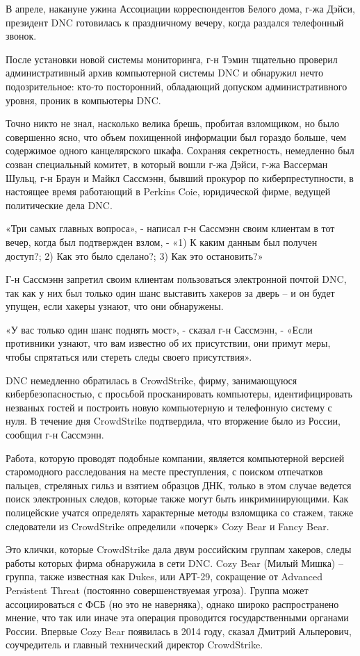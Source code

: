 В апреле, накануне ужина Ассоциации корреспондентов Белого дома, г-жа
Дэйси, президент DNC готовилась к праздничному вечеру, когда раздался
телефонный звонок.

После установки новой системы мониторинга, г-н Тэмин тщательно проверил
административный архив компьютерной системы DNC и обнаружил нечто
подозрительное: кто-то посторонний, обладающий допуском
административного уровня, проник в компьютеры DNC.

Точно никто не знал, насколько велика брешь, пробитая взломщиком, но
было совершенно ясно, что объем похищенной информации был гораздо
больше, чем содержимое одного канцелярского шкафа. Сохраняя секретность,
немедленно был созван специальный комитет, в который вошли г-жа Дэйси,
г-жа Вассерман Шульц, г-н Браун и Майкл Сассмэнн, бывший прокурор по
киберпреступности, в настоящее время работающий в Perkins Coie,
юридической фирме, ведущей политические дела DNC.

«Три самых главных вопроса», - написал г-н Сассмэнн своим клиентам в тот
вечер, когда был подтвержден взлом, - «1) К каким данным был получен
доступ?; 2) Как это было сделано?; 3) Как это остановить?»

Г-н Сассмэнн запретил своим клиентам пользоваться электронной почтой
DNC, так как у них был только один шанс выставить хакеров за дверь -- и
он будет упущен, если хакеры узнают, что они обнаружены.

«У вас только один шанс поднять мост», - сказал г-н Сассмэнн, - «Если
противники узнают, что вам известно об их присутствии, они примут меры,
чтобы спрятаться или стереть следы своего присутствия».

DNC немедленно обратилась в CrowdStrike, фирму, занимающуюся
кибербезопасностью, с просьбой просканировать компьютеры,
идентифицировать незваных гостей и построить новую компьютерную и
телефонную систему с нуля. В течение дня CrowdStrike подтвердила, что
вторжение было из России, сообщил г-н Сассмэнн.

Работа, которую проводят подобные компании, является компьютерной
версией старомодного расследования на месте преступления, с поиском
отпечатков пальцев, стреляных гильз и взятием образцов ДНК, только в
этом случае ведется поиск электронных следов, которые также могут быть
инкриминирующими. Как полицейские учатся определять характерные методы
взломщика со стажем, также следователи из CrowdStrike определили
«почерк» Cozy Bear и Fancy Bear.

Это клички, которые CrowdStrike дала двум российским группам хакеров,
следы работы которых фирма обнаружила в сети DNC. Cozy Bear (Милый
Мишка) -- группа, также известная как Dukes, или АРТ-29, сокращение от
Advanced Persistent Threat (постоянно совершенствуемая угроза). Группа
может ассоциироваться с ФСБ (но это не наверняка), однако широко
распространено мнение, что так или иначе эта операция проводится
государственными органами России. Впервые Cozy Bear появилась в 2014
году, сказал Дмитрий Альперович, соучредитель и главный технический
директор CrowdStrike.

